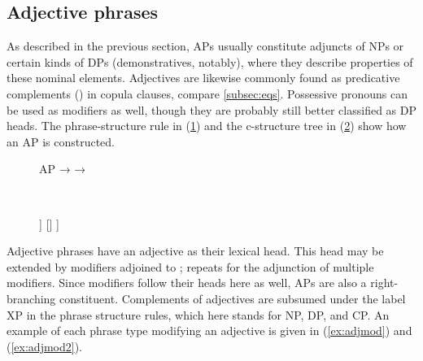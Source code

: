\subsection{Adjective phrases}
\label{subsec:adjps}

As described in the previous section, APs usually constitute adjuncts of NPs or
certain kinds of DPs (demonstratives, notably), where they describe properties
of these nominal elements. Adjectives are likewise commonly found as
predicative complements (\Plink{}) in copula clauses, compare
\autoref{subsec:eqs}. Possessive pronouns can be used as modifiers as well,
though they are probably still better classified as DP heads. The
phrase-structure rule in (\ref{ex:adjpstruct}) and the c-structure tree in
(\ref{ex:adjpcstruct}) show how an AP is constructed.

\begin{figure}[h]
\pex\label{ex:adjpstruct}
\a AP →  
\a {} →  
\xe
\end{figure}

\begin{figure}[h]
\ex~\label{ex:adjpcstruct}
\begin{forest}
[{\anno[\elem{\Adjc} $\vee$ \pass{\Plink}]{AP}}
	[\anno{\xbar{A}}
		[\anno{\xhead{A}}]
		[{\anno[\pass{\GF}]{XP}}]
	]
	[{}]
]
\end{forest}
\xe
\end{figure}

Adjective phrases have an adjective as their lexical head. This head may be
extended by modifiers adjoined to ;  repeats for the adjunction
of multiple modifiers. Since modifiers follow their heads here as well, APs are
also a right-branching constituent. Complements of adjectives are subsumed
under the label XP in the phrase structure rules, which here stands for NP, DP,
and CP. An example of each phrase type modifying an adjective is given in
(\ref{ex:adjmod}) and (\ref{ex:adjmod2}).

